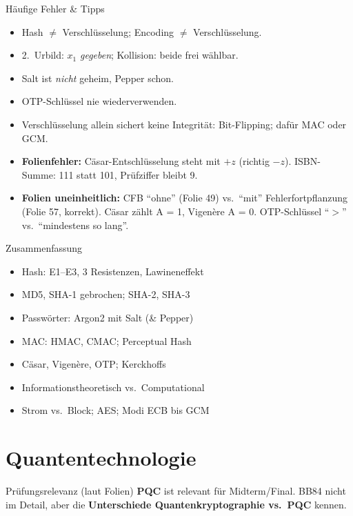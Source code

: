 \documentclass[a4paper, fontsize=7pt]{scrartcl}
\begin{document}
\begin{subbox}{Häufige Fehler \& Tipps}
\begin{itemize}
    \item Hash $\neq$ Verschlüsselung; Encoding $\neq$ Verschlüsselung.
    \item 2.\ Urbild: $x_1$ \emph{gegeben}; Kollision: beide frei wählbar.
    \item Salt ist \emph{nicht} geheim, Pepper schon.
    \item OTP-Schlüssel nie wiederverwenden.
    \item Verschlüsselung allein sichert keine Integrität: Bit-Flipping; dafür
          MAC oder GCM.
    \item \textbf{Folienfehler:} Cäsar-Entschlüsselung steht mit $+z$ (richtig
          $-z$). ISBN-Summe: 111 statt 101, Prüfziffer bleibt 9.
    \item \textbf{Folien uneinheitlich:} CFB ``ohne'' (Folie 49) vs.\ ``mit''
          Fehlerfortpflanzung (Folie 57, korrekt). Cäsar zählt A = 1, Vigenère
          A = 0. OTP-Schlüssel ``$>$'' vs.\ ``mindestens so lang''.
\end{itemize}
\end{subbox}

\begin{subbox}{Zusammenfassung}
\begin{itemize}
    \item Hash: E1--E3, 3 Resistenzen, Lawineneffekt
    \item MD5, SHA-1 gebrochen; SHA-2, SHA-3
    \item Passwörter: Argon2 mit Salt (\& Pepper)
    \item MAC: HMAC, CMAC; Perceptual Hash
    \item Cäsar, Vigenère, OTP; Kerckhoffs
    \item Informationstheoretisch vs.\ Computational
    \item Strom vs.\ Block; AES; Modi ECB bis GCM
\end{itemize}
\end{subbox}

\section{Quantentechnologie}

\begin{subbox}{Prüfungsrelevanz (laut Folien)}
\textbf{PQC} ist relevant für Midterm/Final. BB84 nicht im Detail, aber die
\textbf{Unterschiede Quantenkryptographie vs.\ PQC} kennen.
\end{subbox}
\end{document}
